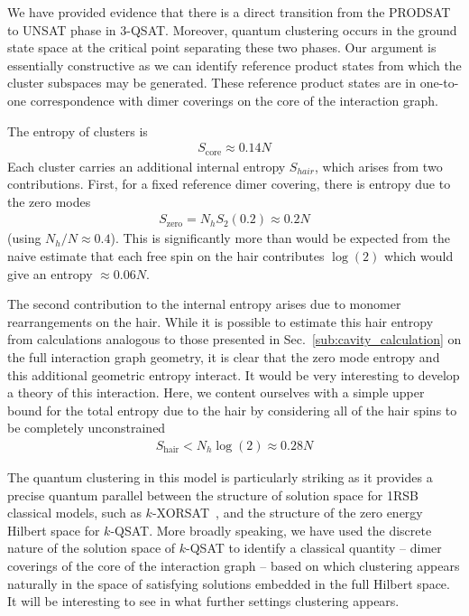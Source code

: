 \documentclass[aps,pra,twocolumn,superscriptaddress,amsmath]{revtex4-1}
\begin{document}
We have provided evidence that there is a direct transition from the PRODSAT to UNSAT phase in 3-QSAT. Moreover, quantum clustering occurs in the ground state space at the critical point separating these two phases.
Our argument is essentially constructive as we can identify reference product states from which the cluster subspaces may be generated.
These reference product states are in one-to-one correspondence with dimer coverings on the core of the interaction graph.

The entropy of clusters is
\begin{align}
	S_{\mathrm{core}} \approx 0.14 N
\end{align}
Each cluster carries an additional internal entropy $S_{hair}$, which arises from two contributions.
First, for a fixed reference dimer covering, there is entropy due to the zero modes
\begin{align}
	S_{\mathrm{zero}} = N_h S_2(0.2) \approx 0.2 N
\end{align}
(using $N_h / N \approx 0.4$).
This is significantly more than would be expected from the naive estimate that each free spin on the hair contributes $\log(2)$ which would give an entropy $\approx 0.06N$.

The second contribution to the internal entropy arises due to monomer rearrangements on the hair. 
While it is possible to estimate this hair entropy from calculations analogous to those presented in Sec.~\ref{sub:cavity_calculation} on the full interaction graph geometry, it is clear that the zero mode entropy and this additional geometric entropy interact.
It would be very interesting to develop a theory of this interaction.
Here, we content ourselves with a simple upper bound for the total entropy due to the hair by considering all of the hair spins to be completely unconstrained
\begin{align}
S_{\mathrm{hair}} < N_h \log (2) \approx 0.28 N
\end{align}

The quantum clustering in this model is particularly striking as it provides a precise quantum parallel between the structure of solution space for 1RSB classical models, such as $k$-XORSAT~\cite{Mezard2003}, and the structure of the zero energy Hilbert space for $k$-QSAT.
%
More broadly speaking, we have used the discrete nature of the solution space of $k$-QSAT to identify a classical quantity -- dimer coverings of the core of the 
interaction graph -- based on which clustering appears naturally in the space of satisfying solutions embedded in the full Hilbert space. 
It will be interesting to see in what further settings clustering appears. 
\end{document}

